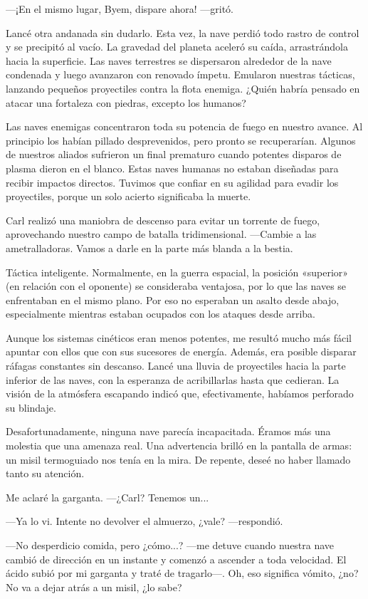 —¡En el mismo lugar, Byem, dispare ahora! —gritó.

Lancé otra andanada sin dudarlo. Esta vez, la nave perdió todo rastro de control y se precipitó al vacío. La gravedad del planeta aceleró su caída, arrastrándola hacia la superficie. Las naves terrestres se dispersaron alrededor de la nave condenada y luego avanzaron con renovado ímpetu. Emularon nuestras tácticas, lanzando pequeños proyectiles contra la flota enemiga. ¿Quién habría pensado en atacar una fortaleza con piedras, excepto los humanos?

Las naves enemigas concentraron toda su potencia de fuego en nuestro avance. Al principio los habían pillado desprevenidos, pero pronto se recuperarían. Algunos de nuestros aliados sufrieron un final prematuro cuando potentes disparos de plasma dieron en el blanco. Estas naves humanas no estaban diseñadas para recibir impactos directos. Tuvimos que confiar en su agilidad para evadir los proyectiles, porque un solo acierto significaba la muerte.

Carl realizó una maniobra de descenso para evitar un torrente de fuego, aprovechando nuestro campo de batalla tridimensional. —Cambie a las ametralladoras. Vamos a darle en la parte más blanda a la bestia.

Táctica inteligente. Normalmente, en la guerra espacial, la posición «superior» (en relación con el oponente) se consideraba ventajosa, por lo que las naves se enfrentaban en el mismo plano. Por eso no esperaban un asalto desde abajo, especialmente mientras estaban ocupados con los ataques desde arriba.

Aunque los sistemas cinéticos eran menos potentes, me resultó mucho más fácil apuntar con ellos que con sus sucesores de energía. Además, era posible disparar ráfagas constantes sin descanso. Lancé una lluvia de proyectiles hacia la parte inferior de las naves, con la esperanza de acribillarlas hasta que cedieran. La visión de la atmósfera escapando indicó que, efectivamente, habíamos perforado su blindaje.

Desafortunadamente, ninguna nave parecía incapacitada. Éramos más una molestia que una amenaza real. Una advertencia brilló en la pantalla de armas: un misil termoguiado nos tenía en la mira. De repente, deseé no haber llamado tanto su atención.

Me aclaré la garganta. —¿Carl? Tenemos un...

—Ya lo vi. Intente no devolver el almuerzo, ¿vale? —respondió.

—No desperdicio comida, pero ¿cómo...? —me detuve cuando nuestra nave cambió de dirección en un instante y comenzó a ascender a toda velocidad. El ácido subió por mi garganta y traté de tragarlo—. Oh, eso significa vómito, ¿no? No va a dejar atrás a un misil, ¿lo sabe?

